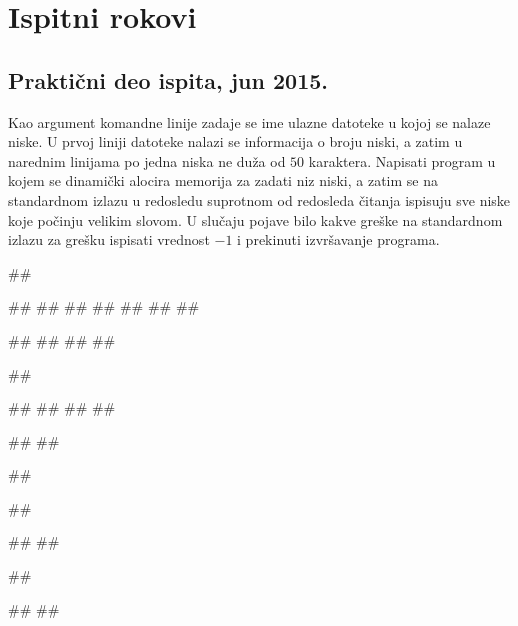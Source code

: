 \appendix
\chapter{Ispitni rokovi}

\section{Praktični deo ispita, jun 2015.}

\begin{Exercise}[label=A_01]
Kao argument komandne linije zadaje se ime ulazne datoteke u kojoj se nalaze niske. U prvoj liniji datoteke nalazi se informacija o broju niski, a zatim u narednim linijama po jedna niska ne duža od $50$ karaktera. Napisati program u kojem se dinamički alocira memorija za zadati niz niski, a zatim se na standardnom izlazu u redosledu suprotnom od redosleda čitanja ispisuju sve niske koje počinju velikim slovom. U slučaju pojave bilo kakve greške na standardnom izlazu za grešku ispisati vrednost $-1$ i prekinuti izvršavanje programa.

\begin{miditest}
\begin{test}{1}
##

##
##
##
##
##
##
##
  
#\naslovIzlaz#
##
##
##
\end{test}
\end{miditest}
\begin{minitest}
\begin{test}{2}
##

##
##
##
##

#\naslovIzlaz#
#\izlaz{}#
\end{test}
\end{minitest}


\begin{miditest}
\begin{test}{3}
##

##

#\naslovIzlazZaGresku#
##
\end{test}
\end{miditest}
\begin{miditest}
\begin{test}{4}
##

#\naslovIzlazZaGresku#
##
\end{test}
\end{miditest}

\end{Exercise}
\begin{Answer}[ref=A_01]
\end{Answer}


